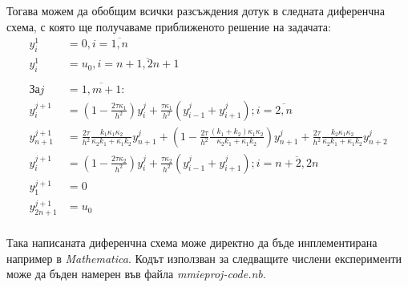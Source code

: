 Тогава можем да обобщим всички разсъждения дотук в следната диференчна схема, с която ще получаваме приближеното решение на задачата:
\begin{align*}
	y_i^1          & = 0, i = \overline{1,n}                                                                                                                                                                                                                                                                                   \\
	y_i^{1}        & = u_0, i = \overline{n+1, 2n+1}                                                                                                                                                                                                                                                                           \\
	\\
	За j         & = \overline{1,m+1}:                                                                                                                                                                                                                                                                                       \\
	y_{i}^{j+1}    & = \left(1-\frac{2 \tau \kappa_1}{h^2}\right)y_{i}^j + \frac{\tau \kappa_1}{h^2}\left(y_{i-1}^j + y_{i+1}^j\right);  i  = \overline{2, n}                                                                                                                                                                  \\
	y_{n+1}^{j+1}  & = \frac{2 \tau}{h^2} \frac{k_1 \kappa_1 \kappa_2 }{\kappa_2 k_1 + \kappa_1 k_2} y_{n+1}^j + \left( 1 - \frac{2 \tau}{h^2}  \frac{(k_1 + k_2) \kappa_1 \kappa_2 }{\kappa_2 k_1 + \kappa_1 k_2} \right) y_{n+1}^j + \frac{2 \tau}{h^2} \frac{k_2 \kappa_1 \kappa_2 }{\kappa_2 k_1 + \kappa_1 k_2} y_{n+2}^j \\
	y_{i}^{j+1}    & = \left(1-\frac{2 \tau \kappa_2}{h^2}\right)y_{i}^j + \frac{\tau \kappa_2}{h^2}\left(y_{i-1}^j + y_{i+1}^j\right);  i  = \overline{n+2, 2n}                                                                                                                                                               \\
	y_{1}^{j+1}    & = 0                                                                                                                                                                                                                                                                                                       \\
	y_{2n+1}^{j+1} & = u_0                                                                                                                                                                                                                                                                                                     \\
\end{align*}

Така написаната диференчна схема може директно да бъде инплементирана например в \textit{Mathematica}. Кодът използван за следващите числени експерименти може да бъден намерен във файла \textit{mmieproj-code.nb}.